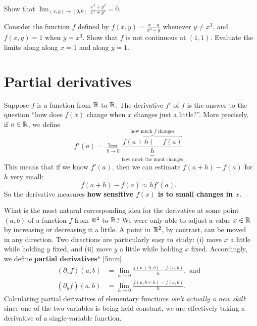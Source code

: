 \documentclass{watsonbook}
\begin{document}
  \begin{exercise}{}{}
    Show that $\displaystyle{\lim_{(x,y) \to (0,0)} \frac{x^3 + y^3}{x^2 + y^2}} =
    0$. 
  \end{exercise}

  \begin{exercise}{}{}
    Consider the function $f$ defined by $f(x,y) = \frac{x-y}{x^3-y}$
    whenever $y \neq x^3$, and $f(x,y) = 1$ when $y = x^3$. Show that
    $f$ is not continuous at $(1,1)$. Evaluate the limits along along
    $x=1$ and along $y=1$.
  \end{exercise}

  \section{Partial derivatives} \label{sec:partial}



  Suppose $f$ is a function from $\mathbb{R}$ to $\mathbb{R}$. The derivative $f'$ of
  $f$ is the answer to the question ``how does $f(x)$ change when $x$
  changes just a little?''. More precisely, if $a\in \mathbb{R}$, we define
  \[
    f'(a) = \lim_{h \to 0} \frac{\overbrace{f(a+h)-f(a)}^{\text{how
          much $f$ changes}}}{\underbrace{h}_{\text{how much the input
          changes}}}
  \]
  This means that if we know $f'(a)$, then we can estimate
  $f(a+h) - f(a)$ for $h$ very small:
  \[
    f(a+h) - f(a) \approx h
    f'(a). 
  \]
  So the derivative measures \textbf{how sensitive $f(x)$ is to small
    changes in $x$}.
  
  What is the most natural corresponding idea for the derivative at
  some point $(a,b)$ of a function $f$ from $\mathbb{R}^2$ to $\mathbb{R}$? We were
  only able to adjust a value $x\in \mathbb{R}$ by increasing or decreasing it
  a little. A point in $\mathbb{R}^2$, by contrast, can be moved in any
  direction. Two directions are particularly easy to study: (i) move
  $x$ a little while holding $y$ fixed, and (ii) move $y$ a little
  while holding $x$ fixed. Accordingly, we define \textbf{partial
    derivatives}* [5mm]
  \begin{align*}
    (\partial_x f)(a,b) &= \lim_{h \to 0}\frac{f(a+h,b) - f(a,b)}{h},
                          \text{ and} \\
    (\partial_y f)(a,b) &= \lim_{h \to 0}\frac{f(a,b+h) - f(a,b)}{h}. 
  \end{align*}
  Calculating partial derivatives of elementary functions \textit{isn't
  actually a new skill}: since one of the two
  variables is being held constant, we are effectively taking a
  derivative of a single-variable function.
\end{document}
